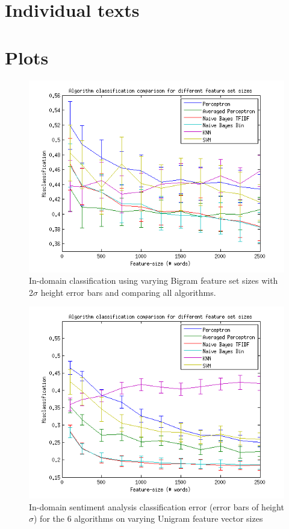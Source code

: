\chapter{Individual texts}





\chapter{Plots}
\begin{figure}[H]
\centering
\includegraphics[scale = 1]{../Plottar/feature-size100-2500bigram.png}
\caption{In-domain classification using varying Bigram feature set sizes with 2$\sigma$ height error bars and comparing all algorithms.}
\end{figure} 

\begin{figure}[H]
\centering
\includegraphics[scale = 1]{../Plottar/feature-size100-2500all.png}
\caption{In-domain sentiment analysis classification error (error bars of height $\sigma$) for the 6 algorithms on varying Unigram feature vector sizes}
\end{figure} 

